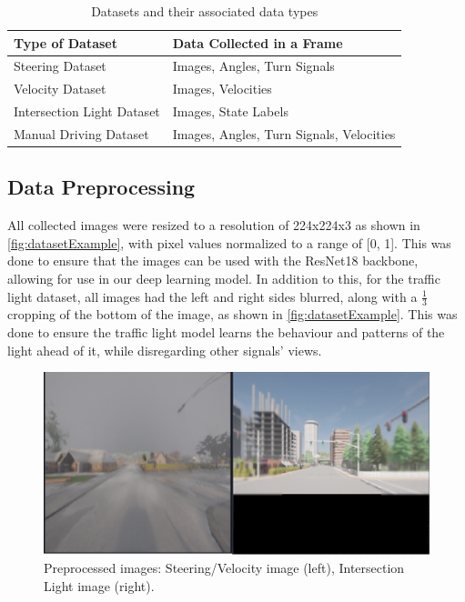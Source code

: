 \documentclass{article} %
\begin{document}
\begin{table}[h]
\centering
\caption{Datasets and their associated data types}
\vspace{0.5em}
\begin{tabular}{|p{5cm}|p{7cm}|}
\hline
\textbf{Type of Dataset} & \textbf{Data Collected in a Frame} \\ \hline
Steering Dataset & Images, Angles, Turn Signals \\ \hline
Velocity Dataset & Images, Velocities \\ \hline
Intersection Light Dataset & Images, State Labels \\ \hline
Manual Driving Dataset & Images, Angles, Turn Signals, Velocities \\ \hline
\end{tabular}
\end{table}


\subsection{Data Preprocessing}

All collected images were resized to a resolution of 224x224x3 as shown in \autoref{fig:datasetExample}, with pixel values normalized to a range of [0, 1].
This was done to ensure that the images can be used with the ResNet18 backbone, allowing for use in our deep learning model. In addition to this, for the traffic light dataset, all images had the left and right sides blurred, along with a \(\frac{1}{3}\) cropping of the bottom of the image, as shown in \autoref{fig:datasetExample}. This was done to ensure the traffic light model learns the behaviour and patterns of the light ahead of it, while disregarding other signals' views.

\begin{figure}[H] %
    \centering
    \includegraphics[scale=0.4]{example of images in dataset.png} %
    \caption{Preprocessed images: Steering/Velocity image (left), Intersection Light image (right).}
    \label{fig:datasetExample}
\end{figure}
\end{document}
